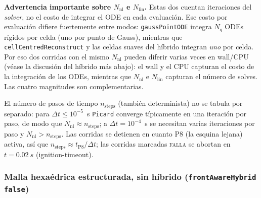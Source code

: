 \documentclass[11pt,a4paper]{article}
\newcommand{\code}[1]{\texttt{\small #1}}
\begin{document}
\noindent\textbf{Advertencia importante sobre $N_{\mathrm{nl}}$ e $N_{\mathrm{lin}}$.}
Estas dos cuentan iteraciones del \emph{solver}, no el costo de integrar el ODE en
cada evaluación. Ese costo por evaluación difiere fuertemente entre modos:
\code{gaussPointODE} integra $N_q$ ODEs rígidos por celda (uno por punto de Gauss),
mientras que \code{cellCentredReconstruct} y las celdas suaves del híbrido integran
\emph{uno} por celda. Por eso dos corridas con el mismo $N_{\mathrm{nl}}$ pueden
diferir varias veces en wall/CPU (véase la discusión del híbrido más abajo): el
wall y el CPU capturan el costo de la integración de los ODEs, mientras que
$N_{\mathrm{nl}}$ e $N_{\mathrm{lin}}$ capturan el número de solves. Las cuatro
magnitudes son complementarias.

El número de pasos de tiempo $n_{\text{steps}}$ (también determinista) no se tabula
por separado: para $\Delta t\le 10^{-5}$~s \code{Picard} converge típicamente en una
iteración por paso, de modo que $N_{\mathrm{nl}}\approx n_{\text{steps}}$; a
$\Delta t=10^{-4}$~s se necesitan varias iteraciones por paso y
$N_{\mathrm{nl}}>n_{\text{steps}}$. Las corridas se detienen en cuanto P8 (la esquina
lejana) activa, así que $n_{\text{steps}}\approx t_{\text{P8}}/\Delta t$; las
corridas marcadas \textsc{falla} se abortan en $t=\SI{0.02}{s}$ (ignition-timeout).

\subsubsection{Malla hexaédrica estructurada, sin híbrido (\code{frontAwareHybrid false})}
\end{document}
